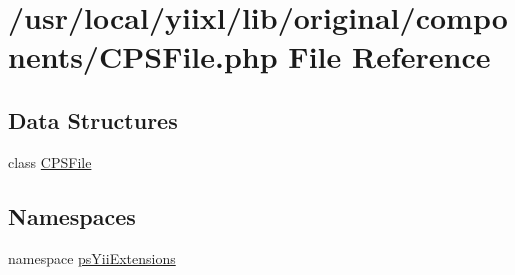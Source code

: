 \hypertarget{CPSFile_8php}{
\section{/usr/local/yiixl/lib/original/components/CPSFile.php File Reference}
\label{CPSFile_8php}
}
\subsection*{Data Structures}
\begin{DoxyCompactItemize}
\item 
class \hyperlink{classCPSFile}{CPSFile}
\end{DoxyCompactItemize}
\subsection*{Namespaces}
\begin{DoxyCompactItemize}
\item 
namespace \hyperlink{namespacepsYiiExtensions}{psYiiExtensions}
\end{DoxyCompactItemize}
